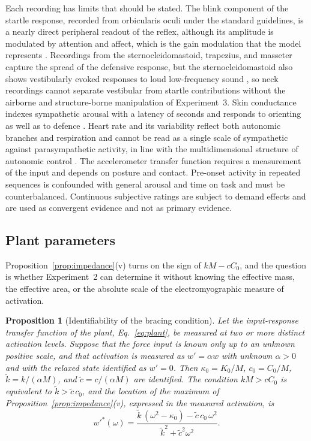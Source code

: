 \documentclass[11pt]{article}
\theoremstyle{plain}
\newtheorem{proposition}{Proposition}
\theoremstyle{definition}
\begin{document}
Each recording has limits that should be stated. The blink component of the startle response, recorded from orbicularis oculi under the standard guidelines, is a nearly direct peripheral readout of the reflex, although its amplitude is modulated by attention and affect, which is the gain modulation that the model represents \citep{blumenthal2005,lang1990}. Recordings from the sternocleidomastoid, trapezius, and masseter capture the spread of the defensive response, but the sternocleidomastoid also shows vestibularly evoked responses to loud low-frequency sound \citep{todd2000}, so neck recordings cannot separate vestibular from startle contributions without the airborne and structure-borne manipulation of Experiment~3. Skin conductance indexes sympathetic arousal with a latency of seconds and responds to orienting as well as to defence \citep{boucsein2012}. Heart rate and its variability reflect both autonomic branches and respiration and cannot be read as a single scale of sympathetic against parasympathetic activity, in line with the multidimensional structure of autonomic control \citep{berntson1991,taskforce1996}. The accelerometer transfer function requires a measurement of the input and depends on posture and contact. Pre-onset activity in repeated sequences is confounded with general arousal and time on task and must be counterbalanced. Continuous subjective ratings are subject to demand effects and are used as convergent evidence and not as primary evidence.

\subsection{Plant parameters}

Proposition~\ref{prop:impedance}(v) turns on the sign of $kM-cC_0$, and the question is whether Experiment~2 can determine it without knowing the effective mass, the effective area, or the absolute scale of the electromyographic measure of activation.

\begin{proposition}[Identifiability of the bracing condition]
\label{prop:ident}
Let the input-response transfer function of the plant, Eq.~\eqref{eq:plant}, be measured at two or more distinct activation levels. Suppose that the force input is known only up to an unknown positive scale, and that activation is measured as $w'=\alpha w$ with unknown $\alpha>0$ and with the relaxed state identified as $w'=0$. Then $\kappa_0=K_0/M$, $c_0=C_0/M$, $\tilde k=k/(\alpha M)$, and $\tilde c=c/(\alpha M)$ are identified. The condition $kM>cC_0$ is equivalent to $\tilde k>\tilde c\,c_0$, and the location of the maximum of Proposition~\ref{prop:impedance}(v), expressed in the measured activation, is
\[
w'^{\ast}(\omega)=\frac{\tilde k\,(\omega^2-\kappa_0)-\tilde c\,c_0\,\omega^2}{\tilde k^{2}+\tilde c^{2}\omega^{2}} .
\]
\end{proposition}
\end{document}
